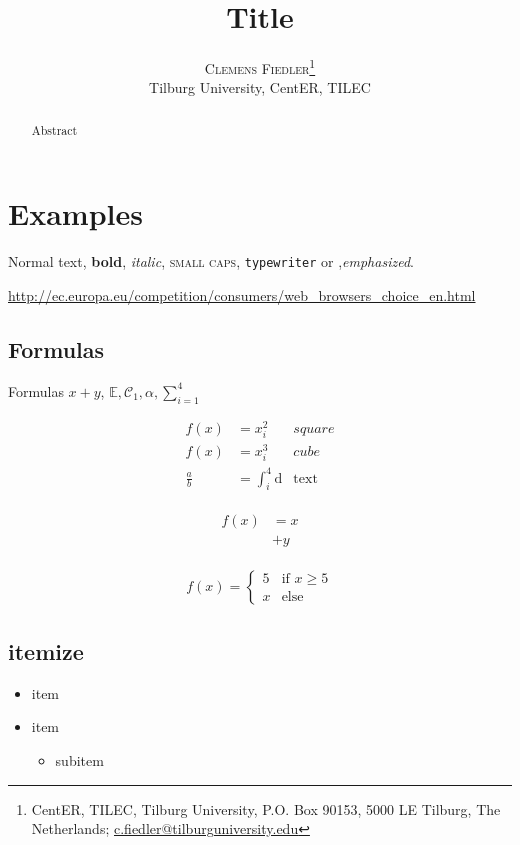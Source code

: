\documentclass[a4paper, 11pt]{article}
\author{\textsc{Clemens Fiedler}\thanks{CentER, TILEC, Tilburg University, P.O. Box 90153, 5000 LE Tilburg, The Netherlands; \href{mailto:c.fiedler@tilburguniversity.edu}{c.fiedler@tilburguniversity.edu}}\\
	Tilburg University, CentER, TILEC}
\title{Title}
\renewcommand{\d}{\text{d}}
\newcommand{\note}[1]{\marginpar{\footnotesize #1} }
\begin{document}
	
\maketitle

\begin{abstract}
	Abstract
\end{abstract}

\tableofcontents
\listoffigures

\section{Examples}\label{sec:examples}

Normal text, \textbf{bold}, \textit{italic}, \textsc{small caps}, \texttt{typewriter} or ,\emph{emphasized}. \note{side note}

\url{http://ec.europa.eu/competition/consumers/web_browsers_choice_en.html}

\subsection{Formulas}
Formulas $x+y$, $\mathbb{E}, \mathcal{C}_1, \alpha, \sum_{i=1}^{4}$

\begin{align}
f(x)&=x_i^2 &square\\
f(x)&=x_i^3 &cube\\
\frac{a}{b}&=\int_{i}^{4} \d &\text{text}\nonumber
\end{align}

\begin{align}
	\begin{split}
	f(x)&=x\\
	&+y
	\end{split}
\end{align}

\begin{align}
	f(x)=
	\begin{cases}
	5& \text{if } x \geq 5\\
	x& \text{else}
	\end{cases}
\end{align}



\subsection{itemize}

\begin{itemize}[noitemsep]
	\item item
	\item item
	\begin{itemize}
		\item subitem
	\end{itemize}
\end{itemize}
\end{document}
